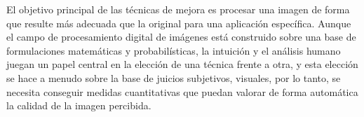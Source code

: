 \documentclass[spanish,twocolumn]{article}
\begin{document}

El objetivo principal de las técnicas de mejora es procesar una imagen de forma que resulte más adecuada que la original para una aplicación específica. 
Aunque el campo de procesamiento digital de imágenes está construido sobre una base de formulaciones matemáticas y probabilísticas, la intuición y el análisis humano juegan un papel central en la elección de una técnica frente a otra, y esta elección se hace a menudo sobre la base de juicios subjetivos, visuales, por lo tanto, se necesita conseguir medidas cuantitativas que puedan valorar de forma automática la calidad de la imagen percibida.
\end{document}
